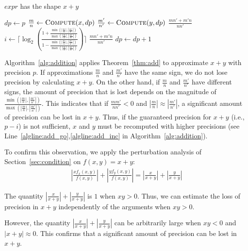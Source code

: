 \documentclass{article}
\newcommand{\true}{\textit{true}}
\newcommand{\expr}{\textit{expr}}
\numberwithin{mytheorem}{section}
\begin{document}
\begin{algorithm}
\caption{Addition}\label{alg:addition}
\begin{algorithmic}[1]
\Require $\expr$ has the shape $x+y$
\Procedure{Compute}{$\expr,p$}

\State $dp \gets p$
\Repeat \label{algline:add_go}
\State $\frac{m}{n} \gets \Call{Compute}{x,dp}$ \label{algline:addition}
\State $\frac{m'}{n'} \gets \Call{Compute}{y,dp}$
 
	\State \Return $\frac{mn'+m'n}{nn'}$
\Else {}
	\State $i\gets \lceil \log_2(\frac{1+\frac{\min(|\frac{m}{n}|,|\frac{m'}{n'}|)}{\max(|\frac{m}{n}|,|\frac{m'}{n'}|)}}{1-\frac{\min(|\frac{m}{n}|,|\frac{m'}{n'}|)}{\max(|\frac{m}{n}|,|\frac{m'}{n'}|)}}) \rceil$
		\State \Return $\frac{mn'+m'n}{nn'}$
	\Else
		\State $dp\gets dp+1$ \label{algline:add_inc}
	\EndIf
\EndIf
\Until{$\true$} 
\EndProcedure
\end{algorithmic}
\end{algorithm} 



Algorithm~\ref{alg:addition} applies Theorem~\ref{thm:add} to approximate $x+y$ with precision $p$. If approximations $\frac{m}{n}$ and $\frac{m'}{n'}$ have the same sign, we do not lose precision by calculating $x+y$. On the other hand, if $\frac{m}{n}$ and $\frac{m'}{n'}$ have different signs, the amount of precision that is lost depends on the magnitude of $\frac{\min (|\frac{m}{n}|,|\frac{m'}{n'}|)}{\max(|\frac{m}{n}|,|\frac{m'}{n'}|)}$. This indicates that if $\frac{mm'}{nn'}<0$ and $|\frac{m}{n}|\approx |\frac{m'}{n'}|$, a significant amount of precision can be lost in $x+y$. Thus, if the guaranteed precision for $x+y$ (i.e., $p-i$) is not sufficient, $x$ and $y$ must be recomputed with higher precisions (see Line~\ref{algline:add_go},\ref{algline:add_inc} in Algorithm~\ref{alg:addition}).  

To confirm this observation, we apply the perturbation analysis of Section~\ref{sec:condition} on $f(x,y)=x+y$:
\begin{align*}
|\frac{xf_x(x,y)}{f(x,y)}|+|\frac{yf_y(x,y)}{f(x,y)}|=|\frac{x}{x+y}|+|\frac{y}{x+y}|
\end{align*}

The quantity $|\frac{x}{x+y}|+|\frac{y}{x+y}|$ is $1$ when $xy>0$. Thus, we can estimate the loss of precision in $x+y$ independently of the arguments when $xy>0$. 

However, the quantity $|\frac{x}{x+y}|+|\frac{y}{x+y}|$ can be arbitrarily large when $xy<0$ and $|x+y|\approx 0$. This confirms that a significant amount of precision can be lost in $x+y$. 
\end{document}
